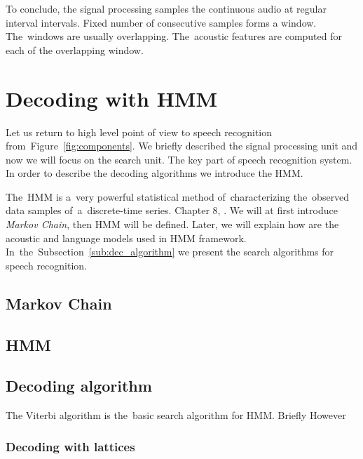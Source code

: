 To conclude, the signal processing samples the continuous audio at regular interval intervals. 
Fixed number of consecutive samples forms a window. The~windows are usually overlapping.
The~acoustic features are computed for each of the overlapping window. 

\section{Decoding with \ac{HMM}}
\label{sub:decoding_with_hmm}
Let us return to high level point of view to speech recognition from~Figure~\ref{fig:components}.
We briefly described the signal processing unit and now we will focus on the search unit. 
The key part of speech recognition system. In order to describe the decoding algorithms we introduce the \acl{HMM}. 

The~\acl{HMM} is a~very powerful statistical method of~characterizing the~observed data samples 
of~a~discrete-time series. Chapter 8, \cite{huang2001spoken}.
We will at first introduce {\it Markov Chain}, then \ac{HMM} will be defined. Later,  we will explain 
how are the acoustic and language models used in \ac{HMM} framework. 
In~the~Subsection~\ref{sub:dec_algorithm} we present the search algorithms for speech recognition.

\subsection*{Markov Chain}
\label{ssub:markov_chain}

\subsection{\acl{HMM}}
\label{ssub:hmm}






\subsection*{Decoding algorithm}
\label{sub:dec_algorithm}
The Viterbi algorithm is the~basic search algorithm for \ac{HMM}. 
Briefly
However


\subsubsection{Decoding with lattices}
\label{sub:lattice}


